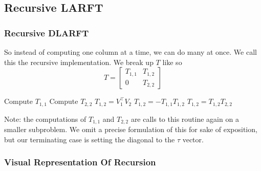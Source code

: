 \documentclass[12pt]{beamer}
\begin{document}
    \subsection{Recursive LARFT}
    \begin{frame}
        \frametitle{Recursive DLARFT}
        So instead of computing one column at a time, we can do many at once. We call this the recursive implementation.
        We break up $T$ like so
        $$
            T = \begin{bmatrix} T_{1,1} & T_{1,2} \\ 0 & T_{2,2} \end{bmatrix}
        $$
        \begin{algorithmic}[1]
            \State Compute $T_{1,1}$ 
            \State Compute $T_{2,2}$ 
            \State $T_{1,2} = V_1^\top V_2$
            \State $T_{1,2} = -T_{1,1}T_{1,2}$
            \State $T_{1,2} = T_{1,2}T_{2,2}$
        \end{algorithmic}
        Note: the computations of $T_{1,1}$ and $T_{2,2}$ are calls to this routine again on a smaller subproblem. 
        We omit a precise formulation of this for sake of exposition, but our terminating case is setting the diagonal
        to the $\tau$ vector.
    \end{frame}
    \begin{frame}
        \frametitle{Visual Representation Of Recursion}
    \end{frame}
\end{document}

